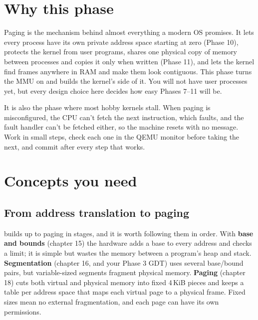 \documentclass[11pt,a4paper]{article}
\begin{document}


\section{Why this phase}

Paging is the mechanism behind almost everything a modern OS promises. It lets every process have its own private
address space starting at zero (Phase 10), protects the kernel from user programs, shares one physical copy of memory
between processes and copies it only when written (Phase 11), and lets the kernel find frames anywhere in RAM and make
them look contiguous. This phase turns the MMU on and builds the kernel's side of it. You will not have user
processes yet, but every design choice here decides how easy Phases 7--11 will be.

It is also the phase where most hobby kernels stall. When paging is misconfigured, the CPU can't fetch the next
instruction, which faults, and the fault handler can't be fetched either, so the machine resets with no message.
Work in small steps, check each one in the QEMU monitor before taking the next, and commit after every step that
works.

\section{Concepts you need}

\subsection{From address translation to paging}

\OSTEP builds up to paging in stages, and it is worth following them in order. With \textbf{base and bounds}
(chapter 15) the hardware adds a base to every address and checks a limit; it is simple but wastes the memory between
a program's heap and stack. \textbf{Segmentation} (chapter 16, and your Phase 3 GDT) uses several base/bound pairs,
but variable-sized segments fragment physical memory. \textbf{Paging} (chapter 18) cuts both virtual and physical
memory into fixed 4\,KiB pieces and keeps a table per address space that maps each virtual page to a physical frame.
Fixed sizes mean no external fragmentation, and each page can have its own permissions.
\end{document}
